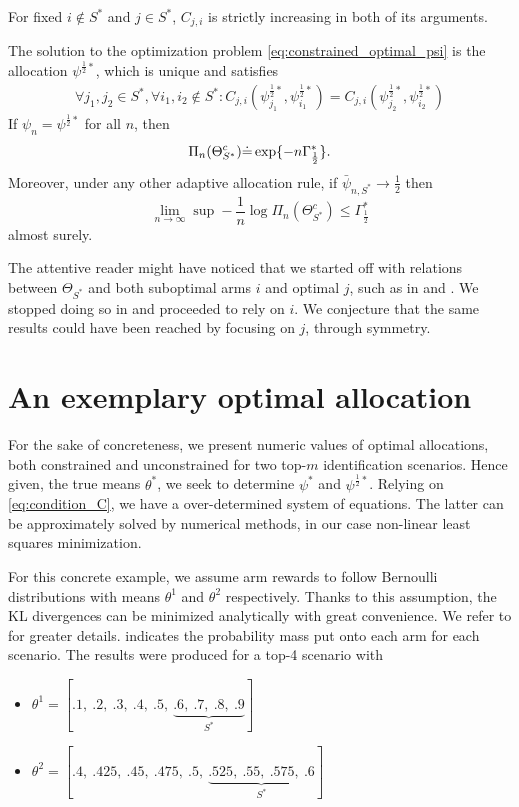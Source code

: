 \begin{lemma}\label{lemma:C_strictly_increasing}
  For fixed $i \notin S^*$ and $j \in S^*$, $C_{j, i}$ is strictly increasing
  in both of its arguments.
\end{lemma}

\begin{proposition}\label{proposition:characterization}
  The solution to the optimization problem \ref{eq:constrained_optimal_psi} is
  the allocation $\psi^{\frac{1}{2}*}$, which is unique and satisfies
  \begin{align}
    \forall j_1, j_2 \in S^*, \forall i_1, i_2 \notin S^*:
    C_{j, i}(\psi^{\frac{1}{2}*}_{j_1}, \psi^{\frac{1}{2}*}_{i_1})
    = C_{j, i}(\psi^{\frac{1}{2}*}_{j_2}, \psi^{\frac{1}{2}*}_{i_2})
    \label{eq:condition_C}
  \end{align}
  If $\psi_n = \psi^{\frac{1}{2}*}$ for all $n$, then
  \[\Pi_n(\Theta_{S^*}^c) \dot{=} \exp \{-n\Gamma^*_{\frac{1}{2}}\}.\]
  Moreover, under any other adaptive allocation rule, if $\bar{\psi}_{n, S^*}
  \rightarrow \frac{1}{2}$ then
  \[\lim_{n \rightarrow \infty} \sup - \frac{1}{n} \log \Pi_n(\Theta^c_{S^*})
      \leq \Gamma^*_{\frac{1}{2}}\]
  almost surely.
\end{proposition}

The attentive reader might have noticed that we started off with relations
between $\Theta_{S^*}$ and both suboptimal arms $i$ and optimal $j$, such as in
 and . We stopped doing
so in  and proceeded to rely on $i$. We conjecture  that the
same results could have been reached by focusing on $j$, through symmetry.

\section{An exemplary optimal allocation}
    \label{section:concrete_optimal_allocation}
For the sake of concreteness, we present numeric values of optimal allocations,
both constrained and unconstrained for two top-$m$ identification scenarios.
Hence given, the true means $\theta^*$, we seek to determine $\psi^*$ and
$\psi^{\frac{1}{2}*}$. Relying on \eqref{eq:condition_C}, we have a
over-determined system of equations. The latter can be approximately solved by
numerical methods, in our case non-linear least squares minimization.

For this concrete example, we assume arm rewards to follow Bernoulli
distributions with means $\theta^1$ and $\theta^2$ respectively. Thanks to this
assumption, the KL divergences can be minimized analytically with great
convenience. We refer to  for greater details.
 indicates the probability mass put onto each arm
for each scenario. The results were produced for a top-4 scenario with
\begin{itemize}
  \item $\theta^1 = [.1,\ .2,\ .3,\ .4,\ .5,\ \underbrace{.6,\ .7,\ .8,\
      .9}_\text{$S^*$}]$
  \item $\theta^2 = [.4,\ .425,\ .45,\ .475,\ .5,\ \underbrace{.525,\ .55,\
      .575,\ .6}_\text{$S^*$}]$
\end{itemize}

